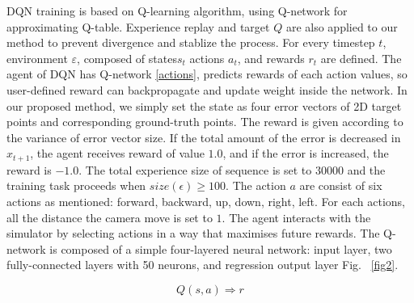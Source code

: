 \documentclass[10pt]{article}
\begin{document}
DQN training is based on Q-learning\cite{ref1} algorithm, using Q-network for approximating Q-table. Experience replay and target $Q$ are also applied to our method to prevent divergence and  stablize the process. For every timestep $t$, environment $\varepsilon$, composed of states$s_t$ actions $a_t$, and rewards $r_t$ are defined. The agent of DQN has Q-network \ref{actions}, predicts rewards of each action values, so user-defined reward can backpropagate and update weight inside the network\cite{ref2}. In our proposed method, we simply set the state as four error vectors of 2D target points and corresponding ground-truth points. The reward is given according to the variance of error vector size. If the total amount of the error is decreased in $x_{t+1}$, the agent receives reward of value $1.0$, and if the error is increased, the reward is $-1.0$. The total experience size of sequence is set to $30000$ and the training task proceeds when $size(\epsilon) \geq 100$. The action $a$ are consist of six actions as mentioned: forward, backward, up, down, right, left. For each actions, all the distance the camera move is set to $1$. The agent interacts with the simulator by selecting actions in a way that maximises future rewards. The Q-network is composed of a simple four-layered neural network: input layer, two fully-connected layers with 50 neurons, and regression output layer Fig. ~\ref{fig2}.

\begin{equation}\label{actions}
  Q(s, a) \Rightarrow r
\end{equation}
\end{document}
